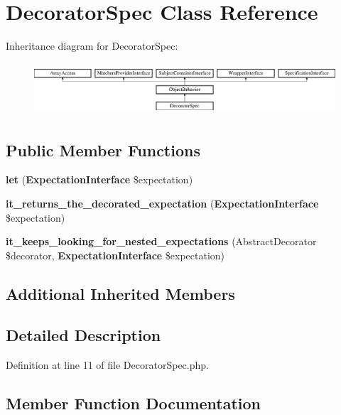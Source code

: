 \section{Decorator\+Spec Class Reference}
\label{classspec_1_1_php_spec_1_1_wrapper_1_1_subject_1_1_expectation_1_1_decorator_spec}
Inheritance diagram for Decorator\+Spec\+:\begin{figure}[H]
\begin{center}
\leavevmode
\includegraphics[height=1.953488cm]{classspec_1_1_php_spec_1_1_wrapper_1_1_subject_1_1_expectation_1_1_decorator_spec}
\end{center}
\end{figure}
\subsection*{Public Member Functions}
\begin{DoxyCompactItemize}
\item 
{\bf let} ({\bf Expectation\+Interface} \$expectation)
\item 
{\bf it\+\_\+returns\+\_\+the\+\_\+decorated\+\_\+expectation} ({\bf Expectation\+Interface} \$expectation)
\item 
{\bf it\+\_\+keeps\+\_\+looking\+\_\+for\+\_\+nested\+\_\+expectations} (Abstract\+Decorator \$decorator, {\bf Expectation\+Interface} \$expectation)
\end{DoxyCompactItemize}
\subsection*{Additional Inherited Members}


\subsection{Detailed Description}


Definition at line 11 of file Decorator\+Spec.\+php.



\subsection{Member Function Documentation}
